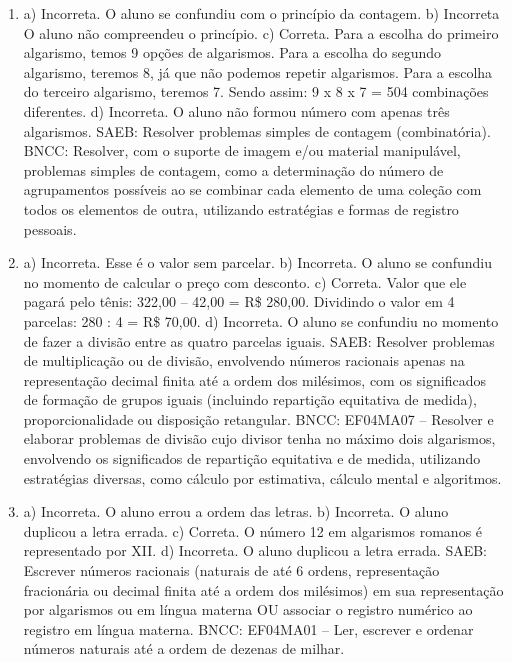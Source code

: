 \begin{enumerate}
\item
a) Incorreta. O aluno se confundiu com o princípio da contagem.
b) Incorreta O aluno não compreendeu o princípio.
c) Correta. Para a escolha do primeiro algarismo, temos 9 opções de algarismos. Para
a escolha do segundo algarismo, teremos 8, já que não podemos repetir
algarismos. Para a escolha do terceiro algarismo, teremos 7. Sendo assim: 9 x 8 x 7 = 504 combinações diferentes.
d) Incorreta. O aluno não formou número com apenas três algarismos.
SAEB: Resolver problemas simples de contagem (combinatória).
BNCC: Resolver, com o suporte de imagem e/ou material manipulável, problemas simples
de contagem, como a determinação do número de agrupamentos possíveis ao se combinar cada
elemento de uma coleção com todos os elementos de outra, utilizando estratégias e formas de
registro pessoais.

\item
a) Incorreta. Esse é o valor sem parcelar.
b) Incorreta. O aluno se confundiu no momento de calcular o preço com desconto.
c) Correta. Valor que ele pagará pelo tênis: 322,00 -- 42,00 = R\$ 280,00.
Dividindo o valor em 4 parcelas: 280 : 4 = R\$ 70,00.
d) Incorreta. O aluno se confundiu no momento de fazer a divisão entre as quatro parcelas iguais.
SAEB: Resolver problemas de multiplicação ou de divisão,
envolvendo números racionais apenas na representação decimal finita até
a ordem dos milésimos, com os significados de formação de grupos iguais
(incluindo repartição equitativa de medida), proporcionalidade ou
disposição retangular.
BNCC: EF04MA07 -- Resolver e elaborar problemas de divisão cujo divisor tenha no máximo dois algarismos,
envolvendo os significados de repartição equitativa e de medida, utilizando estratégias diversas,
como cálculo por estimativa, cálculo mental e algoritmos.

\item
a) Incorreta. O aluno errou a ordem das letras.
b) Incorreta. O aluno duplicou a letra errada.
c) Correta. O número 12 em algarismos romanos é representado por XII.
d) Incorreta. O aluno duplicou a letra errada.
SAEB: Escrever números racionais (naturais de até 6 ordens, representação
fracionária ou decimal finita até a ordem dos milésimos) em sua
representação por algarismos ou em língua materna OU associar o registro
numérico ao registro em língua materna.
BNCC: EF04MA01 -- Ler, escrever e ordenar números naturais até a ordem de dezenas de milhar.
\end{enumerate}